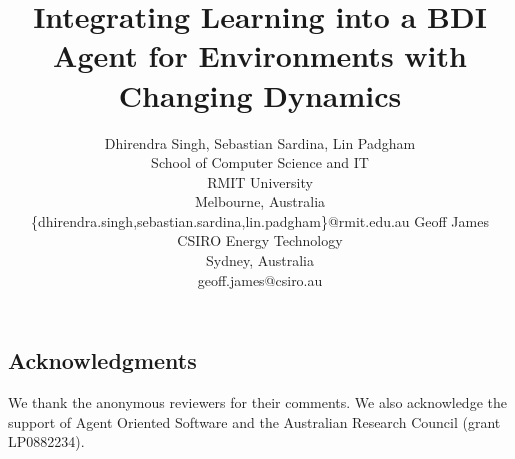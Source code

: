 \documentclass{article}
\title{Integrating Learning into a BDI Agent for Environments with Changing Dynamics}
\author{
Dhirendra Singh, Sebastian Sardina, Lin Padgham\\
School of Computer Science and IT \\
RMIT University\\
Melbourne, Australia\\
{\normalsize\textsf{\{dhirendra.singh,sebastian.sardina,lin.padgham\}@rmit.edu.au}}
\And
Geoff James\\
CSIRO Energy Technology\\
Sydney, Australia\\
{\normalsize \textsf{geoff.james@csiro.au}}
}
\begin{document}
\maketitle

\begin{abstract}

\end{abstract}











\subsection*{Acknowledgments}

We thank the anonymous reviewers for their comments. We also acknowledge the support of Agent
Oriented Software and the Australian Research Council (grant LP0882234).
\small


\end{document}
